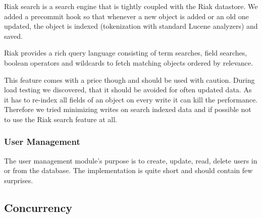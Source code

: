 \documentclass[11pt,a4paper]{report}
\begin{document}
Riak search is a search engine that is tightly coupled with the Riak datastore.
We added a precommit hook so that whenever a new object is added or an old one
updated, the object is indexed (tokenization with standard Lucene analyzers)
and saved.

Riak provides a rich query language consisting of term searches, field searches,
boolean operators and wildcards to fetch matching objects ordered by relevance.

This feature comes with a price though and should be used with caution.
During load testing we discovered, that it should be avoided for often updated
data.
As it has to re-index all fields of an object on every write it can kill the
performance.
Therefore we tried minimizing writes on search indexed data and if possible not
to use the Riak search feature at all.

\subsubsection{User Management}
The user management module's purpose is to create, update, read, delete users
in or from the database. The implementation is quite short and should contain
few surprises.

\subsection{Concurrency}
\label{sec:concurrency}
\end{document}

